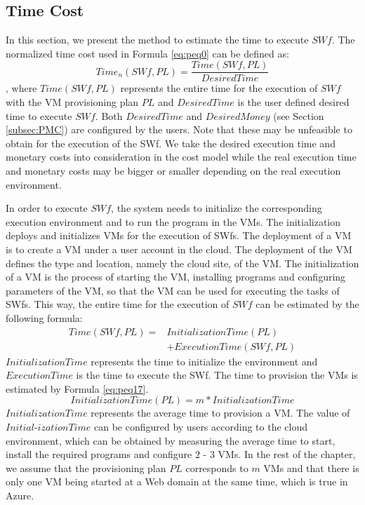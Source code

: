 \subsection{Time Cost}
\label{subsec:PTC}

In this section, we present the method to estimate the time to execute $SWf$. The normalized time cost used in Formula \ref{eq:peq0} can be defined as:
\begin{equation}\label{eq:peq3}
\boxed{
Time_n( SWf, PL ) = \frac{Time( SWf, PL )}{DesiredTime}
}
\end{equation}
, where $Time( SWf, PL )$ represents the entire time for the execution of $SWf$ with the VM provisioning plan $PL$ and $DesiredTime$ is the user defined desired time to execute $SWf$. 
Both $DesiredTime$ and $DesiredMoney$ (see Section \ref{subsec:PMC}) are configured by the users. Note that these may be unfeasible to obtain for the execution of the SWf. We take the desired execution time and monetary costs into consideration in the cost model while the real execution time and monetary costs may be bigger or smaller depending on the real execution environment. 

In order to execute $SWf$, the system needs to initialize the corresponding execution environment and to run the program in the VMs. 
The initialization deploys and initializes VMs for the execution of SWfs. 
The deployment of a VM is to create a VM under a user account in the cloud. 
The deployment of the VM defines the type and location, namely the cloud site, of the VM. 
The initialization of a VM is the process of starting the VM, installing programs and configuring parameters of the VM, so that the VM can be used for executing the tasks of SWfs. 
This way, the entire time for the execution of $SWf$ can be estimated by the following formula:
\begin{equation}\label{eq:peq7}
\boxed{
\begin{split}
Time( SWf, PL ) = & InitializationTime( PL )  \\& + ExecutionTime( SWf, PL )
\end{split}
}
\end{equation}
$InitializationTime$ represents the time to initialize the environment and $ExecutionTime$ is the time to execute the SWf. 
The time to provision the VMs is estimated by Formula \ref{eq:peq17}.
\begin{equation}\label{eq:peq17}
\boxed{
InitializationTime( PL ) = m * InitializationTime
}
\end{equation}
$InitializationTime$ represents the average time to provision a VM. The value of $Initial$-$izationTime$ can be configured by users according to the cloud environment, which can be obtained by measuring the average time to start, install the required programs and configure $2$ - $3$ VMs.
In the rest of the chapter, we assume that the provisioning plan $PL$ corresponds to $m$ VMs and that there is only one VM being started at a Web domain at the same time, which is true in Azure. 

